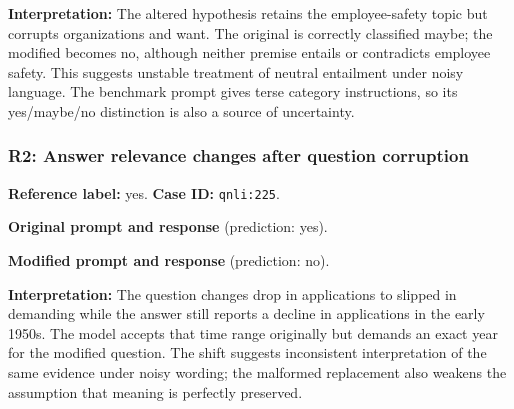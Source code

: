 \textbf{Interpretation:} The altered hypothesis retains the employee-safety topic but corrupts organizations and want. The original is correctly classified maybe; the modified becomes no, although neither premise entails or contradicts employee safety. This suggests unstable treatment of neutral entailment under noisy language. The benchmark prompt gives terse category instructions, so its yes/maybe/no distinction is also a source of uncertainty.


\subsubsection*{R2: Answer relevance changes after question corruption}

\textbf{Reference label:} yes. \textbf{Case ID:} \texttt{qnli:225}.


\begin{samepage}

\textbf{Original prompt and response} (prediction: yes).





\end{samepage}


\begin{samepage}

\textbf{Modified prompt and response} (prediction: no).





\end{samepage}

\textbf{Interpretation:} The question changes drop in applications to slipped in demanding while the answer still reports a decline in applications in the early 1950s. The model accepts that time range originally but demands an exact year for the modified question. The shift suggests inconsistent interpretation of the same evidence under noisy wording; the malformed replacement also weakens the assumption that meaning is perfectly preserved.

